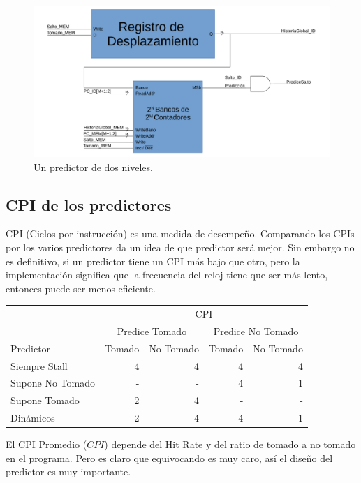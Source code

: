 \documentclass[a4paper]{article}
\begin{document}
\begin{figure}[!htb]
\centering
\includegraphics[scale=0.4]{./img/two_level_predictor}
\caption{Un predictor de dos niveles.}
\label{fig:two_level_predictor}
\end{figure}

\subsection{CPI de los predictores}

CPI (Ciclos por instrucción) es una medida de desempeño. Comparando los CPIs por los varios predictores da un idea de que predictor será mejor. Sin embargo no es definitivo, si un predictor tiene un CPI más bajo que otro, pero la implementación significa que la frecuencia del reloj tiene que ser más lento, entonces puede ser menos eficiente.

\begin{tabular}{| l | r  r | r r | }
\cline{2-5}
\multicolumn{1}{c|}{} & \multicolumn{4}{c|}{CPI} \\
\cline{2-5}
\multicolumn{1}{c|}{} & \multicolumn{2}{c|}{Predice Tomado} & \multicolumn{2}{c|}{Predice No Tomado} \\ \hline
Predictor & Tomado & No Tomado & Tomado & No Tomado \\ \hline
Siempre Stall       &   4   &   4   &   4   &   4   \\
Supone No Tomado    &   -   &   -   &   4   &   1   \\
Supone Tomado       &   2   &   4   &   -   &   -   \\
Dinámicos           &   2   &   4   &   4   &   1   \\

\hline
\end{tabular}

El CPI Promedio ($\bar{CPI}$) depende del Hit Rate y del ratio de tomado a no tomado en el programa. Pero es claro que equivocando es muy caro, así el diseño del predictor es muy importante.
\end{document}
